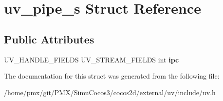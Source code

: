 \hypertarget{structuv__pipe__s}{}\section{uv\+\_\+pipe\+\_\+s Struct Reference}
\label{structuv__pipe__s}
\subsection*{Public Attributes}
\begin{DoxyCompactItemize}
\item 
\mbox{\label{structuv__pipe__s_a9e850ca2d0377520cc1641a729175441}} 
U\+V\+\_\+\+H\+A\+N\+D\+L\+E\+\_\+\+F\+I\+E\+L\+DS U\+V\+\_\+\+S\+T\+R\+E\+A\+M\+\_\+\+F\+I\+E\+L\+DS int {\bfseries ipc}
\end{DoxyCompactItemize}


The documentation for this struct was generated from the following file\+:\begin{DoxyCompactItemize}
\item 
/home/pmx/git/\+P\+M\+X/\+Simu\+Cocos3/cocos2d/external/uv/include/uv.\+h\end{DoxyCompactItemize}
